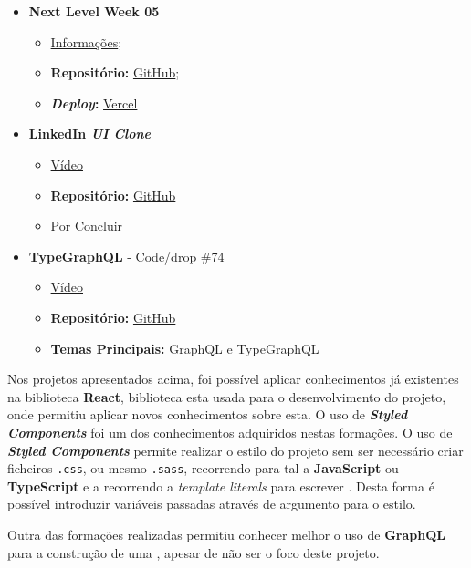 \begin{minipage}[t]{0.45\textwidth}
	\begin{itemize}
		\item \textbf{Next Level Week 05}
			\begin{itemize}
				\item \href{http://nextlevelweek.com/}{Informações};
				\item \textbf{Repositório:} \href{https://github.com/TutoDS/nlw05-react}{GitHub};
				\item \textbf{\textit{Deploy}:} \href{https://podcastr-tutods.vercel.app/}{Vercel}
			\end{itemize}

		\item \textbf{LinkedIn \textit{UI Clone}}
			\begin{itemize}
				\item \href{https://www.youtube.com/watch?v=xP3cxbDUtrc}{Vídeo}
				\item \textbf{Repositório:} \href{https://github.com/TutoDS/reactjs-linkedin-clone}{GitHub}
				\item Por Concluir
			\end{itemize}

		\item \textbf{TypeGraphQL} - Code/drop \#74
			\begin{itemize}
				\item \href{https://www.youtube.com/watch?v=qMc5A5-Ktuw}{Vídeo}
				\item \textbf{Repositório:} \href{https://github.com/TutoDS/typegraphql-code-drops-74}{GitHub}
				\item \textbf{Temas Principais:} GraphQL e TypeGraphQL
			\end{itemize}
	\end{itemize}
\end{minipage}

\vspace{10pt}

Nos projetos apresentados acima, foi possível aplicar conhecimentos já existentes na biblioteca \textbf{React}, biblioteca esta usada para o desenvolvimento do projeto, onde permitiu aplicar novos conhecimentos sobre esta. O uso de \textit{\textbf{Styled Components}} foi um dos conhecimentos adquiridos nestas formações. O uso de \textit{\textbf{Styled Components}} permite realizar o estilo do projeto sem ser necessário criar ficheiros \texttt{.css}, ou mesmo \texttt{.sass}, recorrendo para tal a \textbf{JavaScript} ou \textbf{TypeScript} e a recorrendo a \textit{template literals} para escrever \textbf{}. Desta forma é possível introduzir variáveis passadas através de argumento para o estilo.

Outra das formações realizadas permitiu conhecer melhor o uso de \textbf{GraphQL} para a construção de uma \textbf{}, apesar de não ser o foco deste projeto.